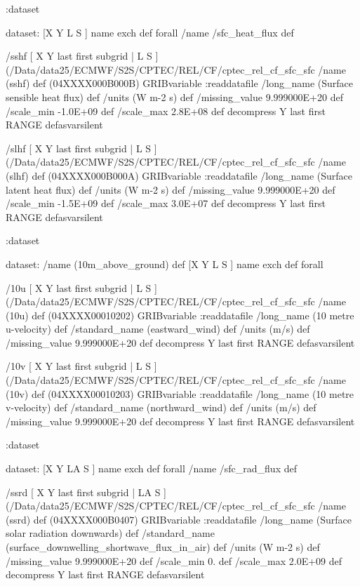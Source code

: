 \begin{ingrid}
{:dataset

dataset:
[X Y L S ] {name exch def } forall
/name /sfc_heat_flux def

/sshf { [ X Y last first subgrid | L S ] (/Data/data25/ECMWF/S2S/CPTEC/REL/CF/cptec_rel_cf_sfc_sfc%
  /name (sshf) def
  (04XXXX000B000B) GRIBvariable
  :readdatafile
  /long_name (Surface sensible heat flux) def
  /units (W m-2 s) def
  /missing_value 9.999000E+20 def
  /scale_min -1.0E+09 def
  /scale_max 2.8E+08 def
  decompress
  Y last first RANGE
} defasvarsilent

/slhf { [ X Y last first subgrid | L S ] (/Data/data25/ECMWF/S2S/CPTEC/REL/CF/cptec_rel_cf_sfc_sfc%
  /name (slhf) def
  (04XXXX000B000A) GRIBvariable
  :readdatafile
  /long_name (Surface latent heat flux) def
  /units (W m-2 s) def
  /missing_value 9.999000E+20 def
  /scale_min -1.5E+09 def
  /scale_max 3.0E+07 def
  decompress
  Y last first RANGE
  } defasvarsilent

:dataset

dataset:
/name (10m_above_ground) def
[X Y L S ] {name exch def } forall

  /10u { [ X Y last first subgrid | L S ] (/Data/data25/ECMWF/S2S/CPTEC/REL/CF/cptec_rel_cf_sfc_sfc%
  /name (10u) def
  (04XXXX00010202) GRIBvariable
  :readdatafile
  /long_name (10 metre u-velocity) def
  /standard_name (eastward_wind) def
  /units (m/s) def
  /missing_value 9.999000E+20 def
  decompress
  Y last first RANGE
} defasvarsilent

/10v { [ X Y last first subgrid | L S ] (/Data/data25/ECMWF/S2S/CPTEC/REL/CF/cptec_rel_cf_sfc_sfc%
  /name (10v) def
  (04XXXX00010203) GRIBvariable
  :readdatafile
  /long_name (10 metre v-velocity) def
  /standard_name (northward_wind) def
  /units (m/s) def
  /missing_value 9.999000E+20 def
  decompress
  Y last first RANGE
} defasvarsilent

:dataset

dataset:
[X Y LA S ] {name exch def } forall
/name /sfc_rad_flux def

/ssrd { [ X Y last first subgrid | LA S ] (/Data/data25/ECMWF/S2S/CPTEC/REL/CF/cptec_rel_cf_sfc_sfc%
  /name (ssrd) def
  (04XXXX000B0407) GRIBvariable
  :readdatafile
  /long_name (Surface solar radiation downwards) def
  /standard_name (surface_downwelling_shortwave_flux_in_air) def
  /units (W m-2 s) def
  /missing_value 9.999000E+20 def
  /scale_min 0. def
  /scale_max 2.0E+09 def
  decompress
  Y last first RANGE
} defasvarsilent

}
\end{ingrid}
